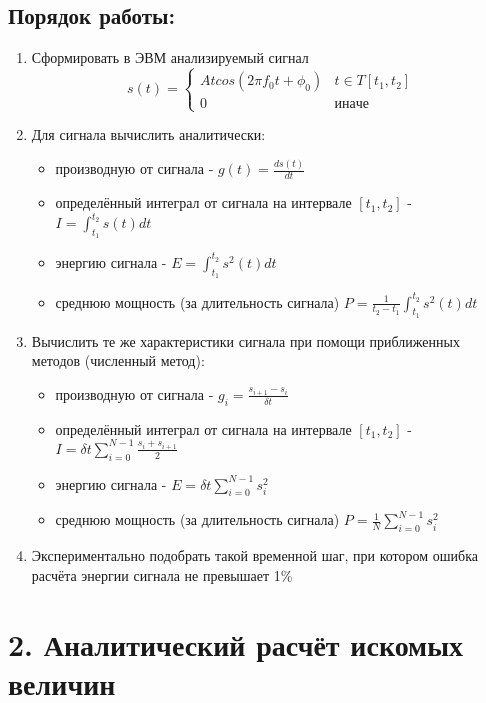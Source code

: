 \documentclass[12pt]{article}
\begin{document}
\subsection*{Порядок работы:}
\begin{enumerate}
	\item Сформировать в ЭВМ анализируемый сигнал 
			\begin{equation}
			s(t) = \begin{cases}
						Atcos(2\pi f_0t + \phi_0) & t \in T[t_1, t_2]\\
						0 & иначе
					  \end{cases}
		\end{equation}
 
	\item Для сигнала вычислить аналитически: 
		\begin{itemize}
			\item производную от сигнала - $g(t) = \frac{ds(t)}{dt}$
			\item определённый интеграл от сигнала на интервале $[t_1, t_2]$ - $I = \int_{t_1}^{t_2} s(t)dt$
			\item энергию сигнала - $ E = \int_{t_1}^{t_2} s^2(t)dt$
			\item среднюю мощность (за длительность сигнала) $P = \frac{1}{t_2-t_1}\int_{t_1}^{t_2} s^2(t)dt$
		\end{itemize}
	\item Вычислить те же характеристики сигнала при помощи приближенных методов (численный метод):
		\begin{itemize}
			\item производную от сигнала - $g_i = \frac{s_{i+1} - s_i}{\delta t}$
			\item определённый интеграл от сигнала на интервале $[t_1, t_2]$ - $I = \delta t \sum_{i=0}^{N-1}\frac{s_i + s_{i+1}}{2}$
			\item энергию сигнала - $ E = \delta t \sum_{i=0}^{N-1} s_i^2$
			\item среднюю мощность (за длительность сигнала) $P = \frac{1}{N}\sum_{i=0}^{N-1} s_i^2$
		\end{itemize}
		
	\item Экспериментально подобрать такой временной шаг, при котором ошибка расчёта энергии сигнала не превышает 1\%

\end{enumerate}

\newpage
 \section*{2. Аналитический расчёт искомых величин}%
 	
\end{document}
